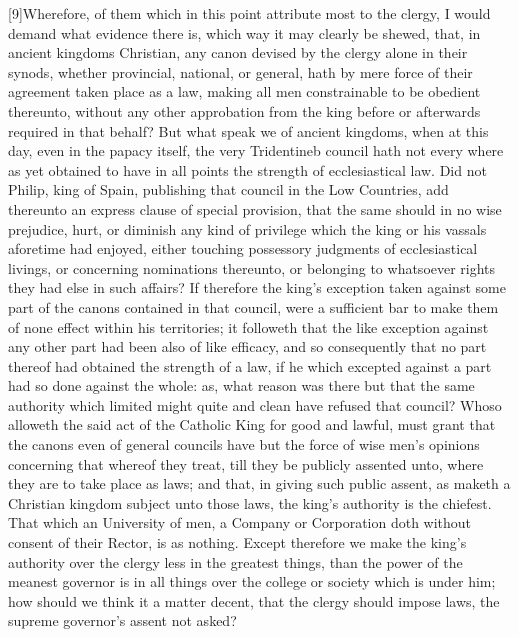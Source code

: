 [9]Wherefore, of them which in this point attribute most to the clergy, I would demand what evidence there is, which way it may clearly be shewed, that, in ancient kingdoms Christian, any canon devised by the clergy alone in their synods, whether provincial, national, or general, hath by mere force of their agreement taken place as a law, making all men constrainable to be obedient thereunto, without any other approbation from the king before or afterwards required in that behalf? But what speak we of ancient kingdoms, when at this day, even in the papacy itself, the very Tridentineb council hath not every where as yet obtained to have in all points the strength of ecclesiastical law. Did not Philip, king of Spain, publishing that council in the Low Countries, add thereunto an express clause of special provision, that the same should in no wise prejudice, hurt, or diminish any kind of privilege which the king or his vassals aforetime had enjoyed, either touching possessory judgments of ecclesiastical livings, or concerning nominations thereunto, or belonging to whatsoever rights they had else in such affairs? If therefore the king’s exception taken against some part of the canons contained in that council, were a sufficient  bar to make them of none effect within his territories; it followeth that the like exception against any other part had been also of like efficacy, and so consequently that no part thereof had obtained the strength of a law, if he which excepted against a part had so done against the whole: as, what reason was there but that the same authority which limited might quite and clean have refused that council? Whoso alloweth the said act of the Catholic King for good and lawful, must grant that the canons even of general councils have but the force of wise men’s opinions concerning that whereof they treat, till they be publicly assented unto, where they are to take place as laws; and that, in giving such public assent, as maketh a Christian kingdom subject unto those laws, the king’s authority is the chiefest. That which an University of men, a Company or Corporation doth without consent of their Rector, is as nothing. Except therefore we make the king’s authority over the clergy less in the greatest things, than the power of the meanest governor is in all things over the college or society which is under him; how should we think it a matter decent, that the clergy should impose laws, the supreme governor’s assent not asked?


